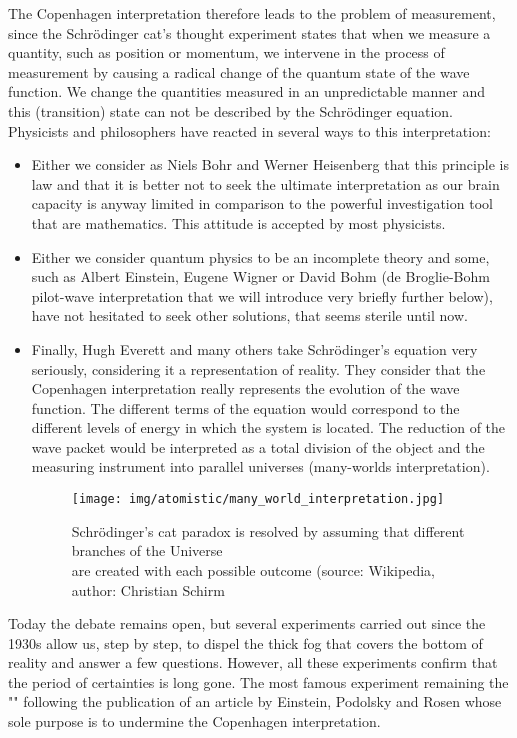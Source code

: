 	The Copenhagen interpretation therefore leads to the problem of measurement, since the Schrödinger cat's thought experiment states that when we measure a quantity, such as position or momentum, we intervene in the process of measurement by causing a radical change of the quantum state of the wave function. We change the quantities measured in an unpredictable manner and this (transition) state can not be described by the Schrödinger equation. Physicists and philosophers have reacted in several ways to this interpretation:
	\begin{itemize}
		\item Either we consider as Niels Bohr and Werner Heisenberg that this principle is law and that it is better not to seek the ultimate interpretation as our brain capacity is anyway limited in comparison to the powerful investigation tool that are mathematics. This attitude is accepted by most physicists.
		
		\item Either we consider quantum physics to be an incomplete theory and some, such as Albert Einstein, Eugene Wigner or David Bohm (de Broglie-Bohm pilot-wave interpretation that we will introduce very briefly further below), have not hesitated to seek other solutions, that seems sterile until now.
		
		\item Finally, Hugh Everett and many others take Schrödinger's equation very seriously, considering it a representation of reality. They consider that the  Copenhagen interpretation really represents the evolution of the wave function. The different terms of the equation would correspond to the different levels of energy in which the system is located. The reduction of the wave packet would be interpreted as a total division of the object and the measuring instrument into parallel universes (many-worlds interpretation).
		\begin{figure}[H]
			\centering
			\texttt{[image: img/atomistic/many\_world\_interpretation.jpg]}
			\caption[]{Schrödinger's cat paradox is resolved by assuming that different branches of the Universe\\ are created with each possible outcome (source: Wikipedia, author: Christian Schirm}
		\end{figure}
	\end{itemize}
	
	Today the debate remains open, but several experiments carried out since the 1930s allow us, step by step, to dispel the thick fog that covers the bottom of reality and answer a few questions. However, all these experiments confirm that the period of certainties is long gone. The most famous experiment remaining the "" following the publication of an article by Einstein, Podolsky and Rosen whose sole purpose is to undermine the Copenhagen interpretation.
	
